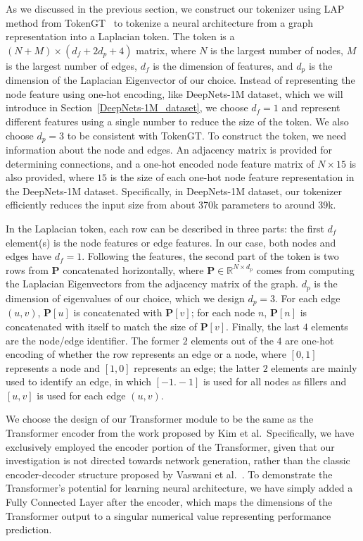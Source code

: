 \documentclass{article}
\begin{document}
As we discussed in the previous section, we construct our tokenizer using LAP method from TokenGT~\cite{pure} to tokenize a neural architecture from a graph representation into a Laplacian token. The token is a $(N+M) \times (d_f + 2d_p + 4)$ matrix, where $N$ is the largest number of nodes, $M$ is the largest number of edges, $d_f$ is the dimension of features, and $d_p$ is the dimension of the Laplacian Eigenvector of our choice. Instead of representing the node feature using one-hot encoding, like DeepNets-1M dataset, which we will introduce in Section~\ref{DeepNets-1M_dataset}, we choose $d_f=1$ and represent different features using a single number to reduce the size of the token. We also choose $d_p=3$ to be consistent with TokenGT.
To construct the token, we need information about the node and edges. An adjacency matrix is provided for determining connections, and a one-hot encoded node feature matrix of $N \times 15$ is also provided, where $15$ is the size of each one-hot node feature representation in the DeepNets-1M dataset. Specifically, in DeepNets-1M dataset, our tokenizer efficiently reduces the input size from about 370k parameters to around 39k.

In the Laplacian token, each row can be described in three parts: the first $d_f$ element(s) is the node features or edge features. In our case, both nodes and edges have $d_f=1$. Following the features, the second part of the token is two rows from $\mathbf{P}$ concatenated horizontally, where $\mathbf{P} \in \mathbb{R}^{N \times d_p}$ comes from computing the Laplacian Eigenvectors from the adjacency matrix of the graph. $d_p$ is the dimension of eigenvalues of our choice, which we design $d_p = 3$. For each edge $(u, v)$, $\mathbf{P}[u]$ is concatenated with $\mathbf{P}[v]$; for each node $n$, $\mathbf{P}[n]$ is concatenated with itself to match the size of $\mathbf{P}[v]$. Finally, the last $4$ elements are the node/edge identifier. The former $2$ elements out of the $4$ are one-hot encoding of whether the row represents an edge or a node, where $[0, 1]$ represents a node and $[1, 0]$ represents an edge; the latter $2$ elements are mainly used to identify an edge, in which $[-1. -1]$ is used for all nodes as fillers and $[u, v]$ is used for each edge $(u, v)$. 

We choose the design of our Transformer module to be the same as the Transformer encoder from the work proposed by Kim et al.~\cite{pure}Specifically, we have exclusively employed the encoder portion of the Transformer, given that our investigation is not directed towards network generation, rather than the classic encoder-decoder structure proposed by Vaswani et al.~\cite{attentionIsAllYouNeed}. To demonstrate the Transformer's potential for learning neural architecture, we have simply added a Fully Connected Layer after the encoder, which maps the dimensions of the Transformer output to a singular numerical value representing performance prediction.
\end{document}
